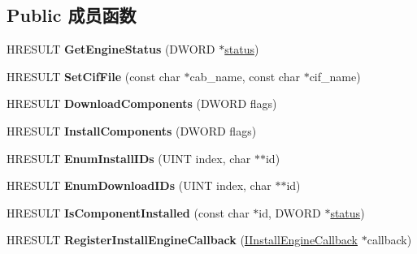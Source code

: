 \subsection*{Public 成员函数}
\begin{DoxyCompactItemize}
\item 
\mbox{\label{interface_i_install_engine_a60866c7ffc198a9fbbce5b77586b9b1e}} 
H\+R\+E\+S\+U\+LT {\bfseries Get\+Engine\+Status} (D\+W\+O\+RD $\ast$\hyperlink{structstatus}{status})
\item 
\mbox{\label{interface_i_install_engine_a8a1406d153eebae7ae4b781d07854b25}} 
H\+R\+E\+S\+U\+LT {\bfseries Set\+Cif\+File} (const char $\ast$cab\+\_\+name, const char $\ast$cif\+\_\+name)
\item 
\mbox{\label{interface_i_install_engine_a651b0efe496b99d28811f58153284a11}} 
H\+R\+E\+S\+U\+LT {\bfseries Download\+Components} (D\+W\+O\+RD flags)
\item 
\mbox{\label{interface_i_install_engine_af3c915b32452976eb6515b9f90b4bf34}} 
H\+R\+E\+S\+U\+LT {\bfseries Install\+Components} (D\+W\+O\+RD flags)
\item 
\mbox{\label{interface_i_install_engine_ac99c67917a88b94d56b4616d194afa84}} 
H\+R\+E\+S\+U\+LT {\bfseries Enum\+Install\+I\+Ds} (U\+I\+NT index, char $\ast$$\ast$id)
\item 
\mbox{\label{interface_i_install_engine_a0ad3097bfcf29a61d4f00cc9ae520f6a}} 
H\+R\+E\+S\+U\+LT {\bfseries Enum\+Download\+I\+Ds} (U\+I\+NT index, char $\ast$$\ast$id)
\item 
\mbox{\label{interface_i_install_engine_a03b453cf2674fc035c61415d87391163}} 
H\+R\+E\+S\+U\+LT {\bfseries Is\+Component\+Installed} (const char $\ast$id, D\+W\+O\+RD $\ast$\hyperlink{structstatus}{status})
\item 
\mbox{\label{interface_i_install_engine_acbb7a72a8069555068f072f83113b543}} 
H\+R\+E\+S\+U\+LT {\bfseries Register\+Install\+Engine\+Callback} (\hyperlink{interface_i_install_engine_callback}{I\+Install\+Engine\+Callback} $\ast$callback)

\end{DoxyCompactItemize}
